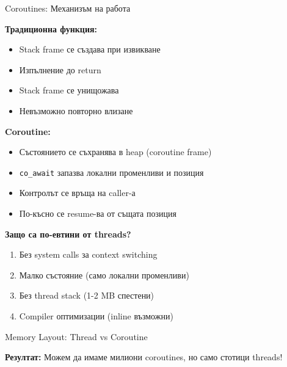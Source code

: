 \documentclass[aspectratio=169]{beamer}
\begin{document}
\begin{frame}{Coroutines: Механизъм на работа}

\textbf{Традиционна функция:}
\begin{itemize}
    \item Stack frame се създава при извикване
    \item Изпълнение до return
    \item Stack frame се унищожава
    \item Невъзможно повторно влизане
\end{itemize}

\vspace{0.3cm}

\textbf{Coroutine:}
\begin{itemize}
    \item Състоянието се съхранява в heap (coroutine frame)
    \item \texttt{co\_await} запазва локални променливи и позиция
    \item Контролът се връща на caller-а
    \item По-късно се resume-ва от същата позиция
\end{itemize}

\vspace{0.3cm}

\textbf{Защо са по-евтини от threads?}
\begin{enumerate}
    \item Без system calls за context switching
    \item Малко състояние (само локални променливи)
    \item Без thread stack (1-2 MB спестени)
    \item Compiler оптимизации (inline възможни)
\end{enumerate}
\end{frame}

\begin{frame}{Memory Layout: Thread vs Coroutine}
\begin{center}
\end{center}

\textbf{Резултат:} Можем да имаме милиони coroutines, но само стотици threads!
\end{frame}
\end{document}

